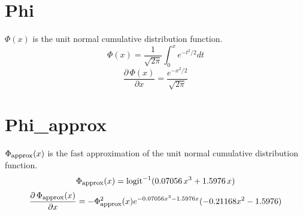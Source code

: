 \section{Phi}\label{Phi-appendix.section}
$\Phi(x)$ is the unit normal cumulative distribution function.
%
\[
\Phi(x) = \frac{1}{\sqrt{2\pi}} \int_{0}^{x} e^{-t^2/2} dt
\]
%
\[
\frac{\partial \, \Phi(x)}{\partial x} = \frac{e^{-x^2/2}}{\sqrt{2\pi}}
\]

\section{Phi\_approx}\label{Phi-approx-appendix.section}
$\Phi_{\mbox{\footnotesize approx}}(x)$ is the fast approximation of the 
unit normal cumulative distribution function.
%
\[
\Phi_{\mbox{\footnotesize approx}}(x) = \mbox{logit}^{-1}(0.07056 \,
x^3 + 1.5976 \, x)
\]
%
\[
\frac{\partial \, \Phi_{\mbox{\footnotesize approx}}(x)}{\partial x}
	= -\Phi_{\mbox{\footnotesize approx}}^2(x)
		e^{-0.07056x^3 - 1.5976x}(-0.21168x^2-1.5976)
\]

